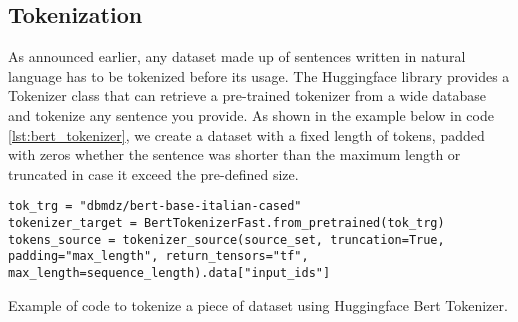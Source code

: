 \subsection{Tokenization}
As announced earlier, any dataset made up of sentences written in natural language has to be tokenized before its usage. The Huggingface library provides a Tokenizer class that can retrieve a pre-trained tokenizer from a wide database and tokenize any sentence you provide. As shown in the example below in code \ref{lst:bert_tokenizer}, we create a dataset with a fixed length of tokens, padded with zeros whether the sentence was shorter than the maximum length or truncated in case it exceed the pre-defined size.
\begin{listing}[H]
\begin{verbatim}
tok_trg = "dbmdz/bert-base-italian-cased"
tokenizer_target = BertTokenizerFast.from_pretrained(tok_trg) 
tokens_source = tokenizer_source(source_set, truncation=True,                      padding="max_length", return_tensors="tf",                         max_length=sequence_length).data["input_ids"]
\end{verbatim}
\caption{Example of code to tokenize a piece of dataset using Huggingface Bert Tokenizer.}
\label{lst:bert_tokenizer}
\end{listing}